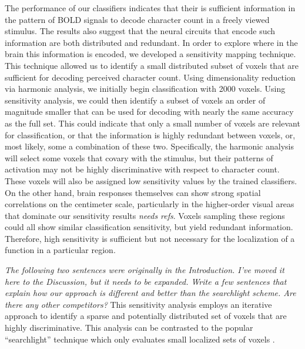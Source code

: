 \documentclass[preprint,5p,authoryear]{elsarticle}
\begin{document}
The performance of our classifiers indicates that their is sufficient information in the pattern of BOLD signals to decode character count in a freely viewed stimulus. 
The results also suggest that the neural circuits that encode such information are both distributed and redundant.
In order to explore where in the brain this information is encoded, we developed a sensitivity mapping technique.
This technique allowed us to identify a small distributed subset of voxels that are sufficient for decoding perceived character count.
Using dimensionality reduction via harmonic analysis, we initially begin classification with 2000 voxels.
Using sensitivity analysis, we could then identify a subset of voxels an order of magnitude smaller that can be used for decoding with nearly the same accuracy as the full set.
This could indicate that only a small number of voxels are relevant for classification, or that the information is highly redundant between voxels, or, most likely, some a combination of these two.
Specifically, the harmonic analysis will select some voxels that covary with the stimulus, but their patterns of activation may not be highly discriminative with respect to character count.
These voxels will also be assigned low sensitivity values by the trained classifiers.
On the other hand, brain responses themselves can show strong spatial correlations on the centimeter scale, particularly in the higher-order visual areas that dominate our sensitivity results \emph{needs refs}. Voxels sampling these regions could all show similar classification sensitivity, but yield redundant information.
Therefore, high sensitivity is sufficient but not necessary for the localization of a function in a particular region.

\emph{The following two sentences were originally in the Introduction. I've moved it here to the Discussion, but it needs to be expanded. Write a few sentences that explain how our approach is different and better than the searchlight scheme. Are there any other competitors?} This sensitivity analysis employs an iterative approach to identify a sparse and potentially distributed set of voxels that are highly discriminative.
This analysis can be contrasted to the popular ``searchlight'' technique which only evaluates small localized sets of voxels \citep{searchlight}.
\end{document}
